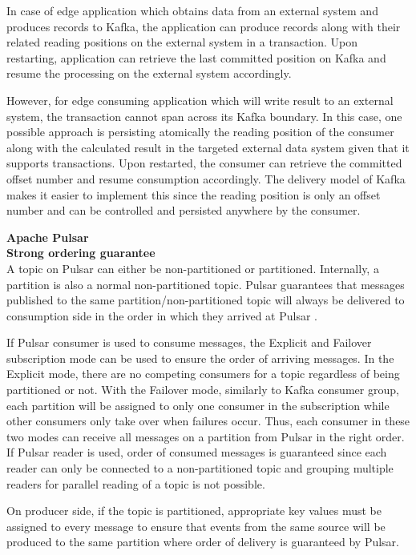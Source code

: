 In case of edge application which obtains data from an external system and produces records to Kafka, the application can produce records along with their related reading positions on the external system in a transaction. Upon restarting, application can retrieve the last committed position on Kafka and resume the processing on the external system accordingly. 

However, for edge consuming application which will write result to an external system, the transaction cannot span across its Kafka boundary. In this case, one possible approach is persisting atomically the reading position of the consumer along with the calculated result in the targeted external data system given that it supports transactions. Upon restarted, the consumer can retrieve the committed offset number and resume consumption accordingly. The delivery model of Kafka makes it easier to implement this since the reading position is only an offset number and can be controlled and persisted anywhere by the consumer.


\large \textbf{Apache Pulsar}\\
\normalsize
\textbf{Strong ordering guarantee}\\
A topic on Pulsar can either be non-partitioned or partitioned. Internally, a partition is also a normal non-partitioned topic. Pulsar guarantees that messages published to the same partition/non-partitioned topic will always be delivered to consumption side in the order in which they arrived at Pulsar \cite{pulsarconceptmessaging}.

If Pulsar consumer is used to consume messages, the Explicit and Failover subscription mode can be used to ensure the order of arriving messages. In the Explicit mode, there are no competing consumers for a topic regardless of being partitioned or not. With the Failover mode, similarly to Kafka consumer group, each partition will be assigned to only one consumer in the subscription while other consumers only take over when failures occur. Thus, each consumer in these two modes can receive all messages on a partition from Pulsar in the right order. If Pulsar reader is used, order of consumed messages is guaranteed since each reader can only be connected to a non-partitioned topic and grouping multiple readers for parallel reading of a topic is not possible. 

On producer side, if the topic is partitioned, appropriate key values must be assigned to every message to ensure that events from the same source will be produced to the same partition where order of delivery is guaranteed by Pulsar.

